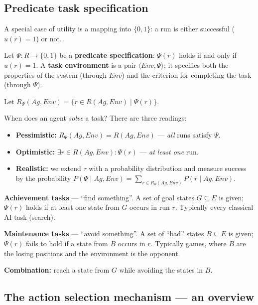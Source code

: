 \documentclass[11pt,a4paper]{article}
\theoremstyle{definition}
\providecommand{\uv}[1]{``#1''}
\begin{document}
\subsection{Predicate task specification}

A special case of utility is a mapping into $\{0,1\}$: a run is either successful ($u(r)=1$) or
not.

\begin{defbox}
Let $\Psi : R \to \{0,1\}$ be a \textbf{predicate specification}: $\Psi(r)$ holds if and only if
$u(r) = 1$. A \textbf{task environment} is a pair $\langle \mathit{Env}, \Psi \rangle$; it
specifies both the properties of the system (through $\mathit{Env}$) and the criterion for
completing the task (through $\Psi$).

Let $R_\Psi(Ag,\mathit{Env}) = \{ r \in R(Ag,\mathit{Env}) \mid \Psi(r) \}$.
\end{defbox}

When does an agent \emph{solve} a task? There are three readings:
\begin{itemize}
\item \textbf{Pessimistic:} $R_\Psi(Ag,\mathit{Env}) = R(Ag,\mathit{Env})$ --- \emph{all} runs
  satisfy $\Psi$.
\item \textbf{Optimistic:} $\exists r \in R(Ag,\mathit{Env}): \Psi(r)$ --- \emph{at least one} run.
\item \textbf{Realistic:} we extend $\tau$ with a probability distribution and measure success by
  the probability
  $P(\Psi \mid Ag,\mathit{Env}) = \sum_{r \in R_\Psi(Ag,\mathit{Env})} P(r \mid Ag,\mathit{Env})$.
\end{itemize}

\begin{defbox}
\textbf{Achievement tasks} --- \uv{find something}. A set of goal states $G \subseteq E$ is given;
$\Psi(r)$ holds if at least one state from $G$ occurs in run $r$. Typically every classical AI task
(search).

\textbf{Maintenance tasks} --- \uv{avoid something}. A set of \uv{bad} states $B \subseteq E$ is
given; $\Psi(r)$ fails to hold if a state from $B$ occurs in $r$. Typically games, where $B$ are
the losing positions and the environment is the opponent.

\textbf{Combination:} reach a state from $G$ while avoiding the states in $B$.
\end{defbox}

\subsection{The action selection mechanism --- an overview}
\label{ssec:vyber-akci}
\end{document}
